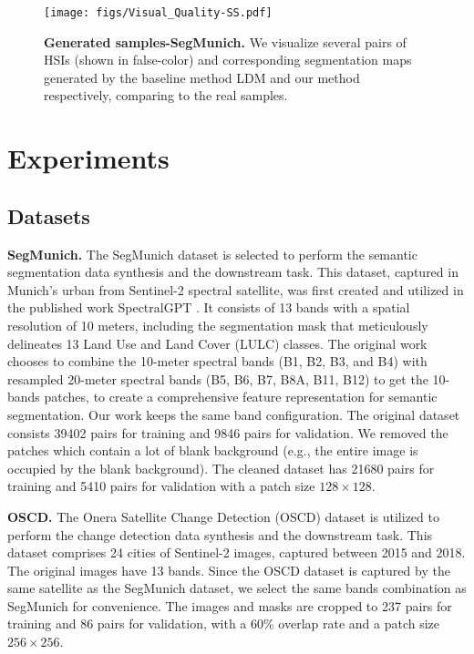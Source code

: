 \label{sec:syn performance}
\begin{figure*}[t]
    \centering
    \texttt{[image: figs/Visual\_Quality-SS.pdf]}
    \vspace{-5mm}
    \caption{\textbf{Generated samples-SegMunich.} We visualize several pairs of HSIs (shown in false-color) and corresponding segmentation maps generated by the baseline method LDM and our method respectively, comparing to the real samples.}
    \label{fig:Visual Quality-SS}
\end{figure*}
\section{Experiments}
\label{sec:experiments}
\subsection{Datasets}
\noindent
\textbf{SegMunich.} The SegMunich dataset is selected to perform the semantic segmentation data synthesis and the downstream task. This dataset, captured in Munich's urban from Sentinel-2 spectral satellite,  was first created and utilized in the published work SpectralGPT \cite{spectralgpt}. It consists of 13 bands with a spatial resolution of 10 meters, including the segmentation mask that meticulously delineates 13 Land Use and Land Cover (LULC) classes. The original work \cite{spectralgpt} chooses to combine the 10-meter spectral bands (B1, B2, B3, and B4) with resampled 20-meter spectral bands (B5, B6, B7, B8A, B11, B12) to get the 10-bands patches, to create a comprehensive feature representation for semantic segmentation. Our work keeps the same band configuration. The original dataset consists 39402 pairs for training and 9846 pairs for validation. We removed the patches which contain a lot of blank background (e.g., the entire image is occupied by the blank background). The cleaned dataset has 21680 pairs for training and 5410 pairs for validation with a patch size $128\times 128$.

\noindent
\textbf{OSCD.} The Onera Satellite Change Detection (OSCD) dataset \cite{oscd} is utilized to perform the change detection data synthesis and the downstream task. This dataset comprises 24 cities of Sentinel-2 images, captured between 2015 and 2018. The original images have 13 bands. Since the OSCD dataset is captured by the same satellite as the SegMunich dataset, we select the same bands combination as SegMunich for convenience. The images and masks are cropped to 237 pairs for training and 86 pairs for validation, with a 60\% overlap rate and a patch size $256 \times 256$.


